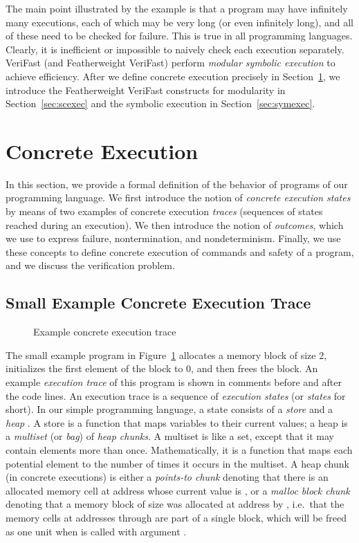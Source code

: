 \documentclass{CSML}
\theoremstyle{definition}\newtheorem{notation}[thm]{Notation}
\theoremstyle{plain}\newtheorem{satz}[thm]{Satz}
\begin{document}
The main point illustrated by the example is that a program may 
have infinitely many executions, each of which may be very long 
(or even infinitely long), and all of these need to be checked 
for failure. This is true in all programming languages. 
Clearly, it is inefficient or impossible to naively check each 
execution separately. VeriFast (and Featherweight VeriFast) 
perform \emph{modular symbolic execution} to achieve 
efficiency. After we define concrete execution precisely in 
Section~\ref{sec:exec}, we introduce the Featherweight VeriFast 
constructs for modularity in Section~\ref{sec:scexec} and the 
symbolic execution in Section~\ref{sec:symexec}. 

\section{Concrete Execution}\label{sec:exec}

In this section, we provide a formal definition of the behavior of programs of our programming language. We first introduce the notion of \emph{concrete execution states} by means of two examples of concrete execution \emph{traces} (sequences of states reached during an execution). We then introduce the notion of \emph{outcomes}, which we use to express failure, nontermination, and nondeterminism. Finally, we use these concepts to define concrete execution of commands and safety of a program, and we discuss the verification problem.

\subsection{Small Example Concrete Execution Trace}

\begin{figure}

\caption{Example concrete execution trace}\label{fig:ex-ctrace}
\end{figure}

The small example program in Figure~\ref{fig:ex-ctrace} allocates a memory block of 
size 2, initializes the first element of the block to 0, and 
then frees the block. An example \emph{execution trace} of this 
program is shown in comments before and after the code lines. 
An execution trace is a sequence of \emph{execution states} (or 
\emph{states} for short). In our simple programming language, a 
state consists of a \emph{store}  and a \emph{heap} . A 
store is a function that maps variables to their current 
values; a heap is a \emph{multiset} (or \emph{bag}) of 
\emph{heap chunks}. A multiset is like a set, except that it 
may contain elements more than once. Mathematically, it is a 
function that maps each potential element to the number of times it 
occurs in the multiset. A heap chunk (in concrete executions) 
is either a \emph{points-to chunk}  denoting 
that there is an allocated memory cell at address  whose 
current value is , or a \emph{malloc block chunk} 
 denoting that a memory block of size  
was allocated at address  by , i.e.~that 
the memory cells at addresses  through  are 
part of a single block, which will be freed as one unit when 
 is called with argument . 
\end{document}

